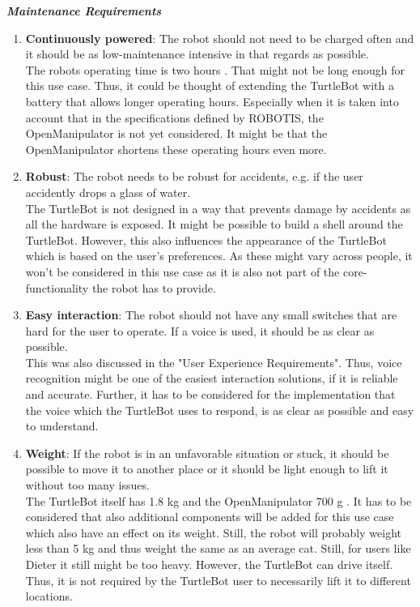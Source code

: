 \documentclass[plainarticle,zihtitle,english,final,hyperref,utf8]{zihpub}
\begin{document}
\textbf{\textit{Maintenance Requirements}}
\begin{enumerate}
    \item \textbf{Continuously powered}: The robot should not need to be charged often and it should be as low-maintenance intensive in that regards as possible. \\
    \newline
    The robots operating time is two hours \cite{tbspecificiations}. That might not be long enough for this use case. Thus, it could be thought of extending the TurtleBot with a battery that allows longer operating hours. Especially when it is taken into account that in the specifications defined by ROBOTIS, the OpenManipulator is not yet considered. It might be that the OpenManipulator shortens these operating hours even more.
    \item \textbf{Robust}: The robot needs to be robust for accidents, e.g. if the user accidently drops a glass of water.\\
    \newline
    The TurtleBot is not designed in a way that prevents damage by accidents as all the hardware is exposed. It might be possible to build a shell around the TurtleBot. However, this also influences the appearance of the TurtleBot which is based on the user's preferences.  As these might vary across people, it won't be considered in this use case as it is also not part of the core-functionality the robot has to provide.
    \item \textbf{Easy interaction}: The robot should not have any small switches that are hard for the user to operate. If a voice is used, it should be as clear as possible.\\
    \newline
    This was also discussed in the "User Experience Requirements". Thus, voice recognition might be one of the easiest interaction solutions, if it is reliable and accurate. Further, it has to be considered for the implementation that the voice which the TurtleBot uses to respond, is as clear as possible and easy to understand. 
    \item \textbf{Weight}: If the robot is in an unfavorable situation or stuck, it should be possible to move it to another place or it should be light enough to lift it without too many issues.\\
    \newline
    The TurtleBot itself has 1.8 kg \cite{tbspecificiations} and the OpenManipulator 700 g \cite{omspec}. It has to be considered that also additional components will be added for this use case which also have an effect on its weight. Still, the robot will probably weight less than 5 kg and thus weight the same as an average cat. Still, for users like Dieter it still might be too heavy. However, the TurtleBot can drive itself. Thus, it is not required by the TurtleBot user to necessarily lift it to different locations.

\end{enumerate}
\end{document}
